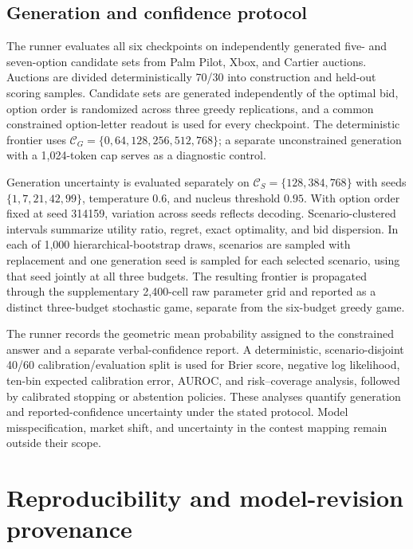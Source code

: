 \documentclass{article}
\begin{document}
\subsection{Generation and confidence protocol}
\label{app:prospectiveuq}
The runner evaluates all six checkpoints on independently generated five- and seven-option candidate sets from Palm Pilot, Xbox, and Cartier auctions. Auctions are divided deterministically 70/30 into construction and held-out scoring samples. Candidate sets are generated independently of the optimal bid, option order is randomized across three greedy replications, and a common constrained option-letter readout is used for every checkpoint. The deterministic frontier uses $\mathcal C_G=\{0,64,128,256,512,768\}$; a separate unconstrained generation with a 1,024-token cap serves as a diagnostic control.

Generation uncertainty is evaluated separately on $\mathcal C_S=\{128,384,768\}$ with seeds $\{1,7,21,42,99\}$, temperature $0.6$, and nucleus threshold $0.95$. With option order fixed at seed 314159, variation across seeds reflects decoding. Scenario-clustered intervals summarize utility ratio, regret, exact optimality, and bid dispersion. In each of 1,000 hierarchical-bootstrap draws, scenarios are sampled with replacement and one generation seed is sampled for each selected scenario, using that seed jointly at all three budgets. The resulting frontier is propagated through the supplementary 2,400-cell raw parameter grid and reported as a distinct three-budget stochastic game, separate from the six-budget greedy game.

The runner records the geometric mean probability assigned to the constrained answer and a separate verbal-confidence report. A deterministic, scenario-disjoint 40/60 calibration/evaluation split is used for Brier score, negative log likelihood, ten-bin expected calibration error, AUROC, and risk--coverage analysis, followed by calibrated stopping or abstention policies. These analyses quantify generation and reported-confidence uncertainty under the stated protocol. Model misspecification, market shift, and uncertainty in the contest mapping remain outside their scope.

\section{Reproducibility and model-revision provenance}
\label{app:reproducibility}
\end{document}
